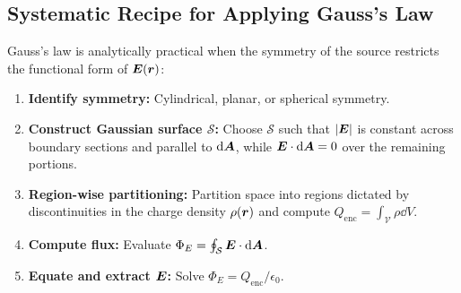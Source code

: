 \subsection{Systematic Recipe for Applying Gauss's Law}

Gauss's law is analytically practical when the symmetry of the source restricts the functional form of $\vb*{E}(\vb*{r})$:
\begin{enumerate}\itemsep2pt
    \item \textbf{Identify symmetry:} Cylindrical, planar, or spherical symmetry.
    \item \textbf{Construct Gaussian surface $\mathcal{S}$:} Choose $\mathcal{S}$ such that $|\vb*{E}|$ is constant across boundary sections and parallel to $\dd\vb*{A}$, while $\vb*{E} \cdot \dd\vb*{A} = 0$ over the remaining portions.
    \item \textbf{Region-wise partitioning:} Partition space into regions dictated by discontinuities in the charge density $\rho(\vb*{r})$ and compute $Q_{\text{enc}} = \int_{\mathcal{V}} \rho \dd{V}$.
    \item \textbf{Compute flux:} Evaluate $\Phi_E = \oint_{\mathcal{S}} \vb*{E} \cdot \dd{\vb*{A}}$.
    \item \textbf{Equate and extract $\vb*{E}$:} Solve $\Phi_E = Q_{\text{enc}}/\epsilon_0$.
\end{enumerate}

